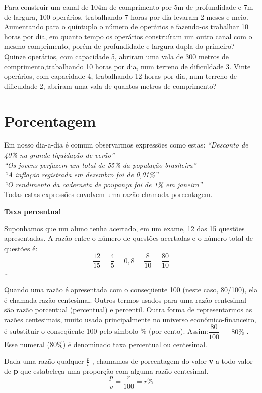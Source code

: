 \begin{exercicios}
    \exitem{} Para construir um canal de 104m de comprimento por 5m de profundidade e 7m de largura, 100 operários, trabalhando 7 horas por dia levaram 2 meses e meio. Aumentando para o quíntuplo o número de operários e fazendo-os trabalhar 10 horas por dia, em quanto tempo os operários construíram um outro canal com o mesmo comprimento, porém de profundidade e largura dupla do primeiro?     
	\exitem{} Quinze operários, com capacidade 5, abriram uma vala de 300 metros de comprimento,trabalhando 10 horas por dia, num terreno de dificuldade 3. Vinte operários, com capacidade 4, trabalhando 12 horas por dia, num terreno de dificuldade 2, abriram uma vala de quantos metros de comprimento?
\end{exercicios}

\section{Porcentagem}

	Em nosso dia-a-dia é comum observarmos expressões como estas:
	\textit{“Desconto de 40\% na grande liquidação de verão”\\
	“Os jovens perfazem um total de 55\% da população brasileira”\\
	“A inflação registrada em dezembro foi de 0,01\%”\\
	“O rendimento da caderneta de poupança foi de 1\% em janeiro”\\}
	Todas estas expressões envolvem uma razão chamada porcentagem.
	
	\textbf{Taxa percentual}

	Suponhamos que um aluno tenha acertado, em um exame, 12 das 15 questões apresentadas. A razão entre o número de questões acertadas e o número total de questões é:
	$$\dfrac{12}{15}=\dfrac{4}{5}=0,8=\dfrac{8}{10}=\dfrac{80}{10}$$\dots
		
	Quando uma razão é apresentada com o conseqüente 100 (neste caso, 80/100), ela é chamada razão centesimal. Outros termos usados para uma razão centesimal são razão porcentual (percentual)  e percentil. 
	Outra forma de representarmos as razões centesimais, muito usada principalmente no universo econômico-financeiro, é substituir o conseqüente  100 pelo símbolo \% (por cento). Assim:$\dfrac{80}{100}\, = \,80\%$ . Esse numeral (80\%) é denominado taxa percentual ou centesimal. 
\begin{caixa}
	\begin{tdefinicao}
		Dada uma razão qualquer $\frac{p}{v}$ , chamamos de porcentagem do valor \textbf{v} a todo valor de \textbf{p} que estabeleça uma proporção com alguma razão centesimal.
		$$\dfrac{p}{v}=\dfrac{r}{100}=r\%$$
	\end{tdefinicao}
\end{caixa}

